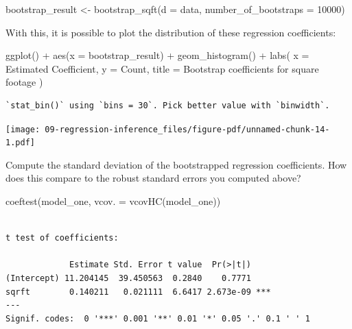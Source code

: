 \documentclass[
  letterpaper,
  DIV=11,
  numbers=noendperiod]{scrreprt}
\newenvironment{Shaded}{\begin{snugshade}}{\end{snugshade}}
\newcommand{\AttributeTok}[1]{\textcolor[rgb]{0.40,0.45,0.13}{#1}}
\newcommand{\DecValTok}[1]{\textcolor[rgb]{0.68,0.00,0.00}{#1}}
\newcommand{\FunctionTok}[1]{\textcolor[rgb]{0.28,0.35,0.67}{#1}}
\newcommand{\NormalTok}[1]{\textcolor[rgb]{0.00,0.23,0.31}{#1}}
\newcommand{\OtherTok}[1]{\textcolor[rgb]{0.00,0.23,0.31}{#1}}
\newcommand{\SpecialCharTok}[1]{\textcolor[rgb]{0.37,0.37,0.37}{#1}}
\newcommand{\StringTok}[1]{\textcolor[rgb]{0.13,0.47,0.30}{#1}}
\begin{document}
\begin{Shaded}
\begin{Highlighting}[]
\NormalTok{bootstrap\_result }\OtherTok{\textless{}{-}} \FunctionTok{bootstrap\_sqft}\NormalTok{(}\AttributeTok{d =}\NormalTok{ data, }\AttributeTok{number\_of\_bootstraps =} \DecValTok{10000}\NormalTok{)}
\end{Highlighting}
\end{Shaded}

With this, it is possible to plot the distribution of these regression
coefficients:

\begin{Shaded}
\begin{Highlighting}[]
\FunctionTok{ggplot}\NormalTok{() }\SpecialCharTok{+} 
  \FunctionTok{aes}\NormalTok{(}\AttributeTok{x =}\NormalTok{ bootstrap\_result) }\SpecialCharTok{+} 
  \FunctionTok{geom\_histogram}\NormalTok{() }\SpecialCharTok{+} 
  \FunctionTok{labs}\NormalTok{(}
    \AttributeTok{x =} \StringTok{\textquotesingle{}Estimated Coefficient\textquotesingle{}}\NormalTok{, }
    \AttributeTok{y =} \StringTok{\textquotesingle{}Count\textquotesingle{}}\NormalTok{, }
    \AttributeTok{title =} \StringTok{\textquotesingle{}Bootstrap coefficients for square footage\textquotesingle{}}
\NormalTok{  )}
\end{Highlighting}
\end{Shaded}

\begin{verbatim}
`stat_bin()` using `bins = 30`. Pick better value with `binwidth`.
\end{verbatim}

\texttt{[image: 09-regression-inference\_files/figure-pdf/unnamed-chunk-14-1.pdf]}

Compute the standard deviation of the bootstrapped regression
coefficients. How does this compare to the robust standard errors you
computed above?

\begin{Shaded}
\begin{Highlighting}[]
\FunctionTok{coeftest}\NormalTok{(model\_one, }\AttributeTok{vcov. =} \FunctionTok{vcovHC}\NormalTok{(model\_one))}
\end{Highlighting}
\end{Shaded}

\begin{verbatim}

t test of coefficients:

             Estimate Std. Error t value  Pr(>|t|)    
(Intercept) 11.204145  39.450563  0.2840    0.7771    
sqrft        0.140211   0.021111  6.6417 2.673e-09 ***
---
Signif. codes:  0 '***' 0.001 '**' 0.01 '*' 0.05 '.' 0.1 ' ' 1
\end{verbatim}
\end{document}
